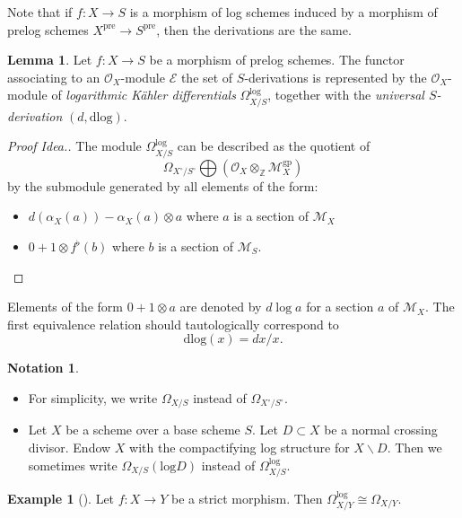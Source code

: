 \documentclass{amsart}
\def\gp{\textrm{gp}}
\theoremstyle{definition}
\newtheorem{example}[theorem]{Example}
\newtheorem{lemma}[theorem]{Lemma}
\newtheorem{notation}[theorem]{Notation}
\newcommand\llog{\mathrm{log}}
\newcommand\dlog{\mathrm{dlog}}
\newcommand{\mO}{\mathcal{O}}
\newcommand{\mM}{\mathcal{M}}
\newcommand{\mbZ}{\mathbb{Z}}
\numberwithin{equation}{section}
\begin{document}
Note that if $f:X\to S$ is a morphism of log schemes induced by a morphism of prelog schemes $X^{\mathrm{pre}}\to S^{\mathrm{pre}}$, then the derivations are the same. 

\begin{lemma}\label{DefinitionDifferentials}\cite[Chapter IV, Theorem 1.2.4]{Ogus}
	Let $f:X\to S$ be a morphism of prelog schemes. The functor associating to an $\mathcal{O}_X$-module $\mathcal{E}$ the set of $S$-derivations is represented by the $\mathcal{O}_X$-module of \textit{logarithmic Kähler differentials} $\Omega^{\log}_{X/S}$, together with the \textit{universal $S$-derivation} $(d,\dlog)$.
\end{lemma}

\begin{proof}[Proof Idea.]
	The module $\Omega^{\log}_{X/S}$ can be described as the quotient of  
\[
\Omega_{X^{\circ}/S^{\circ}} \bigoplus (\mO_X\otimes_\mbZ \mM_X^\gp)
\]
by the submodule generated by all elements of the form:
 	\begin{itemize}
 		\item $d(\alpha_X(a))-\alpha_X(a)\otimes a$ where $a$ is a section of  $\mathcal{M}_X$
 		\item $0+1\otimes f^\flat (b)$ where $b$ is a section  of $\mathcal{M}_S$.\qedhere
 	\end{itemize}  
\end{proof}
 	Elements of the form $0+1\otimes a$ are denoted by $d\log a$ for a section $a$ of $\mathcal{M}_X$. The first equivalence relation should tautologically correspond to 
\[
\dlog(x)=dx/x.
\]
\begin{notation}
	\begin{itemize}
		\item 	For simplicity, we write $\Omega_{X/S}$ instead of $\Omega_{X^\circ/S^\circ}$.
		\item 	Let $X$ be a scheme over a base scheme $S$. Let $D\subset X$ be a normal crossing divisor. Endow $X$ with the compactifying log structure for $X\backslash D$. Then we sometimes write $\Omega_{X/S}(\llog D)$ instead of $\Omega^{\llog}_{X/S}$.
	\end{itemize}
\end{notation}
\begin{example}[{\cite[Chapter IV, Example 1.2.17.]{Ogus}}]
	Let $f:X\to Y$ be a strict morphism. Then $\Omega^{\log}_{X/Y}\cong \Omega_{X/Y}$. 
\end{example}
\end{document}
